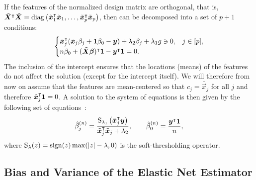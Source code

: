 If the features of the normalized design matrix are orthogonal, that is,
\(\tilde{\boldsymbol{X}}^\intercal \tilde{\boldsymbol{X}} = \operatorname{diag}\left(\tilde{\boldsymbol{x}}_1^\intercal
\tilde{\boldsymbol{x}}_1, \dots, \tilde{\boldsymbol{x}}_p^\intercal \tilde{\boldsymbol{x}}_p\right) \), then
 can be decomposed into a set of \(p + 1\) conditions:
%
\[
  \begin{cases}
    \tilde{\boldsymbol{x}}_j^\intercal (\tilde{\boldsymbol{x}}_j \beta_j + \boldsymbol{1} \beta_0 - \boldsymbol{y}) + \lambda_2 \beta_j + \lambda_1 g \ni 0, & j \in [p], \\
    n \beta_0 + (\tilde{\boldsymbol{X}}\boldsymbol{\beta})^\intercal \boldsymbol{1} -  \boldsymbol{y}^\intercal \boldsymbol{1} = 0.
  \end{cases}
\]
%
The inclusion of the intercept ensures that the locations (means) of the features do not
affect the solution (except for the intercept itself). We will therefore from now on assume
that the features are mean-centered so that \(c_j = \bar{\vec{x}}_j\) for all \(j\) and
therefore \(\tilde{\boldsymbol{x}}_j^\intercal \boldsymbol{1} = 0\). A solution to the system of equations is then
given by the following set of equations~\citep{donoho1994}:
%
\begin{equation*}
  \hat{\beta}^{(n)}_j = \frac{\operatorname{S}_{\lambda_1}\left(\tilde{\boldsymbol{x}}_j^\intercal \boldsymbol{y}\right)}{\tilde{\boldsymbol{x}}_j^\intercal \tilde{\boldsymbol{x}}_j + \lambda_2},
  \qquad
  \hat{\beta}_0^{(n)} = \frac{\boldsymbol{y}^\intercal \boldsymbol{1}}{n},
\end{equation*}
%
where \(\operatorname{S}_\lambda(z) = \operatorname{sign}(z) \max(|z| - \lambda, 0)\) is the soft-thresholding
operator.

\subsection{Bias and Variance of the Elastic Net Estimator}
\label{sec:bias-var-deriv}

